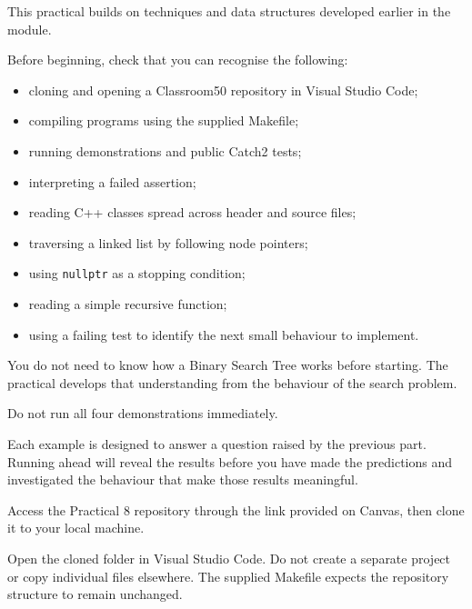 \documentclass{csc2059practical}
\begin{document}

This practical builds on techniques and data structures developed earlier in the
module.

Before beginning, check that you can recognise the following:

\begin{itemize}
    \item cloning and opening a Classroom50 repository in Visual Studio Code;
    \item compiling programs using the supplied Makefile;
    \item running demonstrations and public Catch2 tests;
    \item interpreting a failed assertion;
    \item reading C++ classes spread across header and source files;
    \item traversing a linked list by following node pointers;
    \item using \texttt{nullptr} as a stopping condition;
    \item reading a simple recursive function;
    \item using a failing test to identify the next small behaviour to
          implement.
\end{itemize}

You do not need to know how a Binary Search Tree works before starting. The
practical develops that understanding from the behaviour of the search problem.
\clearpage

\begin{tipbox}
Do not run all four demonstrations immediately.

Each example is designed to answer a question raised by the previous part.
Running ahead will reveal the results before you have made the predictions and
investigated the behaviour that make those results meaningful.
\end{tipbox}



Access the Practical 8 repository through the link provided on Canvas, then
clone it to your local machine.

Open the cloned folder in Visual Studio Code. Do not create a separate project
or copy individual files elsewhere. The supplied Makefile expects the repository
structure to remain unchanged.
\end{document}

